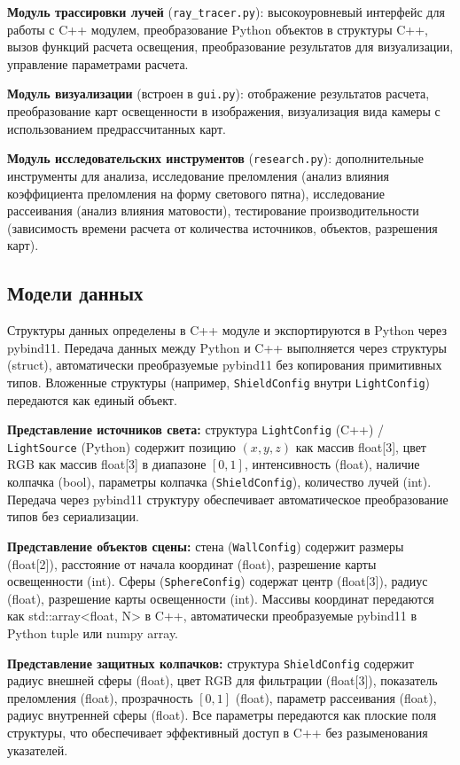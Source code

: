 \textbf{Модуль трассировки лучей} (\texttt{ray\_tracer.py}): высокоуровневый интерфейс для работы с C++ модулем, преобразование Python объектов в структуры C++, вызов функций расчета освещения, преобразование результатов для визуализации, управление параметрами расчета.

\textbf{Модуль визуализации} (встроен в \texttt{gui.py}): отображение результатов расчета, преобразование карт освещенности в изображения, визуализация вида камеры с использованием предрассчитанных карт.

\textbf{Модуль исследовательских инструментов} (\texttt{research.py}): дополнительные инструменты для анализа, исследование преломления (анализ влияния коэффициента преломления на форму светового пятна), исследование рассеивания (анализ влияния матовости), тестирование производительности (зависимость времени расчета от количества источников, объектов, разрешения карт).

\subsection{Модели данных}

Структуры данных определены в C++ модуле и экспортируются в Python через pybind11. Передача данных между Python и C++ выполняется через структуры (struct), автоматически преобразуемые pybind11 без копирования примитивных типов. Вложенные структуры (например, \texttt{ShieldConfig} внутри \texttt{LightConfig}) передаются как единый объект.

\textbf{Представление источников света:} структура \texttt{LightConfig} (C++) / \texttt{LightSource} (Python) содержит позицию $(x, y, z)$ как массив float[3], цвет RGB как массив float[3] в диапазоне $[0, 1]$, интенсивность (float), наличие колпачка (bool), параметры колпачка (\texttt{ShieldConfig}), количество лучей (int). Передача через pybind11 структуру обеспечивает автоматическое преобразование типов без сериализации.

\textbf{Представление объектов сцены:} стена (\texttt{WallConfig}) содержит размеры (float[2]), расстояние от начала координат (float), разрешение карты освещенности (int). Сферы (\texttt{SphereConfig}) содержат центр (float[3]), радиус (float), разрешение карты освещенности (int). Массивы координат передаются как std::array<float, N> в C++, автоматически преобразуемые pybind11 в Python tuple или numpy array.

\textbf{Представление защитных колпачков:} структура \texttt{ShieldConfig} содержит радиус внешней сферы (float), цвет RGB для фильтрации (float[3]), показатель преломления (float), прозрачность $[0, 1]$ (float), параметр рассеивания (float), радиус внутренней сферы (float). Все параметры передаются как плоские поля структуры, что обеспечивает эффективный доступ в C++ без разыменования указателей.

